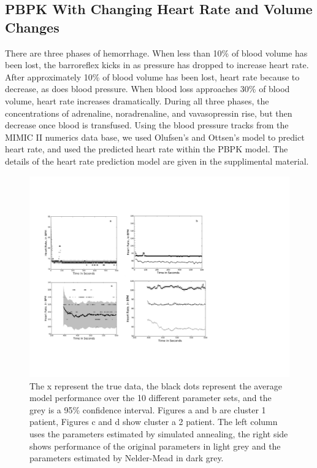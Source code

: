 \documentclass[12pt]{article}
\begin{document}
\subsection*{PBPK With Changing Heart Rate and Volume Changes}

There are three phases of hemorrhage. When less than 10\% of blood volume has been lost, the barroreflex kicks in as pressure has dropped to increase heart rate. \cite{foex1999systemic} After approximately 10\% of blood volume has been lost, heart rate because to decrease, as does blood pressure. When blood loss approaches 30\% of blood volume, heart rate increases dramatically.\cite{jacobsen1990cardiovascular} During all three phases, the concentrations of adrenaline, noradrenaline, and vavasopressin rise, but then decrease once blood is transfused.
Using the blood pressure tracks from the MIMIC II numerics data base, we used Olufsen's and Ottsen's model to predict heart rate, and used the predicted heart rate within the PBPK model. \cite{olufsen2013practical} The details of the heart rate prediction model are given in the supplimental material.

\begin{figure}
        \includegraphics[width=.6\textwidth,trim = {4cm 6cm 15cm 8cm},clip]{figures/singlevsmulti}
         
       \caption{\scriptsize The x represent the true data, the black dots represent the average model performance over the 10 different parameter sets, and the grey is a 95\% confidence interval. Figures a and b are cluster 1 patient, Figures c and d show cluster a 2 patient. The left column uses the parameters estimated by simulated annealing, the right side shows performance of the original parameters in light grey and the parameters estimated by Nelder-Mead in dark grey.}   
       \label{fig:mulitobjperformance}
\end{figure}
\end{document}
